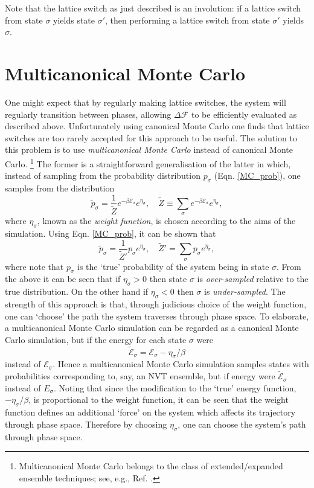 \documentclass{report}
\begin{document}
Note that the lattice switch as just described is an involution: if a lattice switch from state $\sigma$ yields state $\sigma'$, then
performing a lattice switch from state $\sigma'$ yields $\sigma$.


\section{Multicanonical Monte Carlo}
One might expect that by regularly making lattice switches, the system will regularly transition between phases, allowing $\Delta \mathcal{F}$ to 
be efficiently evaluated as described above. Unfortunately using canonical Monte Carlo one finds that lattice switches are too rarely accepted for 
this approach to be useful.
The solution to this problem is to use \emph{multicanonical Monte Carlo}\cite{Berg_1991,Berg_1992,Smith_1995} instead of canonical Monte Carlo.
\footnote{Multicanonical Monte Carlo belongs to the class of extended/expanded ensemble techniques; see, e.g., Ref. \cite{Iba_2001}.}
The former is a straightforward generalisation of the latter in which, instead of sampling from the probability distribution $p_{\sigma}$ 
(Eqn. \eqref{MC_prob}), one samples from the distribution
\begin{equation}\label{MCMC_prob}
\tilde{p}_{\sigma}=\frac{1}{\tilde{Z}}e^{-\beta \mathcal{E}_{\sigma}}e^{\eta_{\sigma}}, \quad \tilde{Z}\equiv\sum_{\sigma}e^{-\beta \mathcal{E}_{\sigma}}e^{\eta_{\sigma}},
\end{equation}
where $\eta_{\sigma}$, known as the \emph{weight function}, is chosen according to the aims of the simulation. 
Using Eqn. \eqref{MC_prob}, it can be shown that
\begin{equation}\label{MCMC_prob_2}
\tilde{p}_{\sigma}=\frac{1}{\tilde{Z}'}p_{\sigma}e^{\eta_{\sigma}}, \quad \tilde{Z}'=\sum_{\sigma}p_{\sigma}e^{\eta_{\sigma}},
\end{equation}
where note that $p_{\sigma}$ is the `true' probability of the system being in state $\sigma$. From the above it can be seen that if 
$\eta_{\sigma}>0$ then state $\sigma$ is \emph{over-sampled} relative to the true distribution. On the other hand if $\eta_{\sigma}<0$ then 
$\sigma$ is \emph{under-sampled}. 
The strength of this approach is that, through judicious choice of the weight function, one can `choose' the path the system traverses 
through phase space. To elaborate, a multicanonical Monte Carlo simulation can be regarded as a canonical Monte Carlo 
simulation, but if the energy for each state $\sigma$ were 
\begin{equation}
\tilde{\mathcal{E}}_{\sigma}=\mathcal{E}_{\sigma}-\eta_{\sigma}/\beta
\end{equation}
instead of $\mathcal{E}_{\sigma}$. Hence a multicanonical Monte Carlo simulation samples states with probabilities corresponding to, say, an NVT ensemble,
but if energy were $\tilde{\mathcal{E}}_{\sigma}$ instead of $E_{\sigma}$. Noting that since the modification to the `true' energy function, 
$-\eta_{\sigma}/\beta$, is proportional to the weight function, it can be seen that the weight function defines an additional `force' on the system 
which affects its trajectory through phase space. Therefore by choosing $\eta_{\sigma}$, one can choose the system's path through phase space. 
\end{document}
